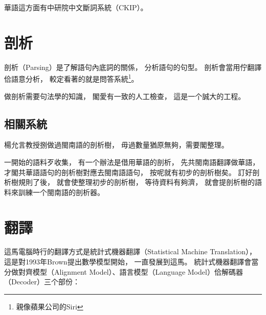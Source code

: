
華語這方面有中研院中文斷詞系統（CKIP）\cite{CKIP論文}。

%

\section{剖析}
\label{節：剖析}
剖析（Parsing）是了解語句內底詞的關係，
分析語句的句型。
剖析會當用佇翻譯佮語意分析，
較定看著的就是問答系統\footnote{親像蘋果公司的Siri}。

做剖析需要句法學的知識，
閣愛有一致的人工檢查，
這是一个誠大的工程。

\subsection{相關系統}
\label{小節：剖析相關系統}
楊允言教授捌做過閩南語的剖析樹\cite{台語文語法結構樹建置}，
毋過數量猶原無夠，需要閣整理。

一開始的語料歹收集，
有一个辦法是借用華語的剖析，
先共閩南語翻譯做華語，
才閣共華語語句的剖析樹\cite{chen2005chinese}對應去閩南語語句，
按呢就有初步的剖析樹矣。
訂好剖析樹規則了後，
就會使整理初步的剖析樹，
等待資料有夠濟，
就會提剖析樹的語料來訓練一个閩南語的剖析器\cite{klein2003accurate}。

\section{翻譯}
\label{節：翻譯}
這馬電腦時行的翻譯方式是統計式機器翻譯（Statistical Machine Translation），
這是對1993年Brown提出數學模型\cite{brown1993mathematics}開始，
一直發展到這馬。
統計式機器翻譯會當分做對齊模型（Alignment Model）、語言模型（Language Model）佮解碼器（Decoder）三个部份：

